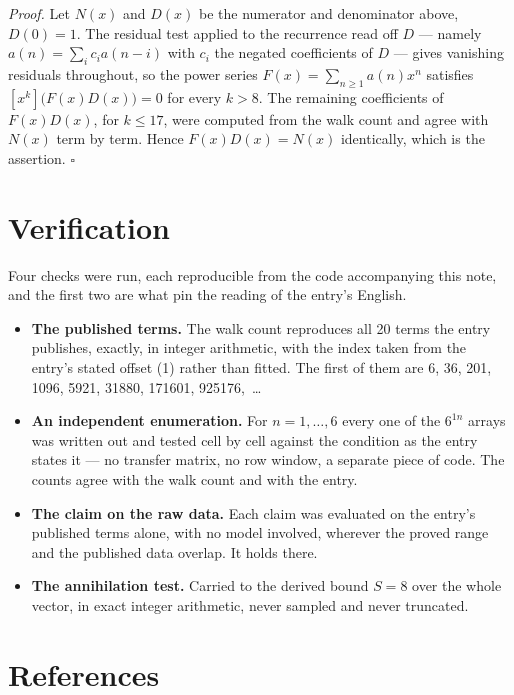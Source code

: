 \documentclass[11pt]{article}
\theoremstyle{definition}
\begin{document}
{\itshape Proof.} Let $N(x)$ and $D(x)$ be the numerator and denominator above, $D(0)=1$. The residual test applied to the recurrence read off $D$ --- namely $a(n) = \sum_i c_i a(n-i)$ with $c_i$ the negated coefficients of $D$ --- gives vanishing residuals throughout, so the power series $F(x)=\sum_{n\ge 1}a(n)x^n$ satisfies $[x^k]\bigl(F(x)D(x)\bigr) = 0$ for every $k > 8$. The remaining coefficients of $F(x)D(x)$, for $k \le 17$, were computed from the walk count and agree with $N(x)$ term by term. Hence $F(x)D(x) = N(x)$ identically, which is the assertion. $\square$

\section{Verification}

Four checks were run, each reproducible from the code accompanying this note, and the first two are what pin the reading of the entry's English.

\begin{itemize}

\item {\bfseries The published terms.} The walk count reproduces all 20 terms the entry publishes, exactly, in integer arithmetic, with the index taken from the entry's stated offset (1) rather than fitted. The first of them are 6, 36, 201, 1096, 5921, 31880, 171601, 925176,~\dots

\item {\bfseries An independent enumeration.} For $n = 1,\dots,6$ every one of the $6^{1n}$ arrays was written out and tested cell by cell against the condition as the entry states it --- no transfer matrix, no row window, a separate piece of code. The counts agree with the walk count and with the entry.

\item {\bfseries The claim on the raw data.} Each claim was evaluated on the entry's published terms alone, with no model involved, wherever the proved range and the published data overlap. It holds there.

\item {\bfseries The annihilation test.} Carried to the derived bound $S = 8$ over the whole vector, in exact integer arithmetic, never sampled and never truncated.

\end{itemize}

\section{References}
\end{document}
